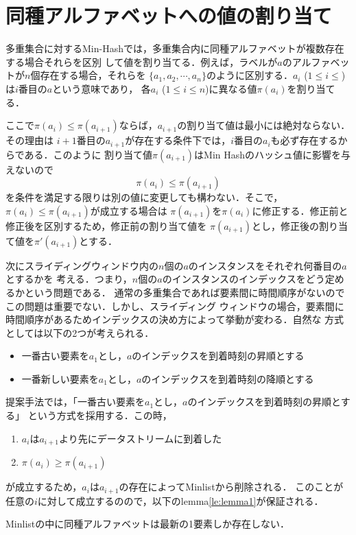 \section{同種アルファベットへの値の割り当て}
多重集合に対するMin-Hashでは，多重集合内に同種アルファベットが複数存在する場合それらを区別
して値を割り当てる．例えば，ラベルが$a$のアルファベットが$n$個存在する場合，それらを
$\{a_1,a_2,\cdots,a_n\}$のように区別する．$a_i$ ($1\le i \le $)は$i$番目の$a$という意味であり，
各$a_i$ ($1\le i \le n$)に異なる値$\pi(a_i)$を割り当てる．

ここで$\pi(a_i) \le \pi(a_{i+1})$ならば，$a_{i+1}$の割り当て値は最小には絶対ならない．その理由は
$i+1$番目の$a_{i+1}$が存在する条件下では，$i$番目の$a_{i}$も必ず存在するからである．このように
割り当て値$\pi(a_{i+1})$はMin Hashのハッシュ値に影響を与えないので
$$\pi(a_i) \le \pi(a_{i+1})$$
を条件を満足する限りは別の値に変更しても構わない．そこで，$\pi(a_i) \le \pi(a_{i+1})$が成立する場合は
$\pi(a_{i+1})$を$\pi(a_{i})$に修正する．修正前と修正後を区別するため，修正前の割り当て値を
$\pi(a_{i+1})$とし，修正後の割り当て値を$\pi'(a_{i+1})$とする．


次にスライディングウィンドウ内の$n$個の$a$のインスタンスをそれぞれ何番目の$a$とするかを
考える．つまり，$n$個の$a$のインスタンスのインデックスをどう定めるかという問題である．
通常の多重集合であれば要素間に時間順序がないのでこの問題は重要でない．しかし、スライディング
ウィンドウの場合，要素間に時間順序があるためインデックスの決め方によって挙動が変わる．自然な
方式としては以下の2つが考えられる．
\begin{itemize}
\item 一番古い要素を$a_1$とし，$a$のインデックスを到着時刻の昇順とする
\item 一番新しい要素を$a_1$とし，$a$のインデックスを到着時刻の降順とする
\end{itemize}

提案手法では，「一番古い要素を$a_1$とし，$a$のインデックスを到着時刻の昇順とする」
という方式を採用する．この時，
\begin{enumerate}
\item $a_i$は$a_{i+1}$より先にデータストリームに到着した
\item $\pi(a_i)\ge \pi(a_{i+1})$
\end{enumerate}
が成立するため，$a_i$は$a_{i+1}$の存在によってMinlistから削除される．
このことが任意の$i$に対して成立するのので，以下のlemma\ref{le:lemma1}が保証される．
\begin{lemma}
  \label{le:lemma1}
  Minlistの中に同種アルファベットは最新の1要素しか存在しない．
  \end{lemma}


